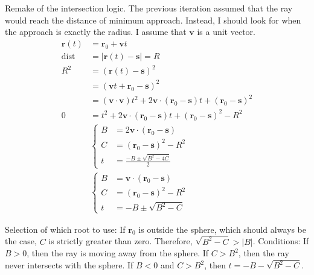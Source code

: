 \documentclass{article}
\renewcommand{\vec}[1]{\mathbf{#1}}
\begin{document}
Remake of the intersection logic.
The previous iteration assumed that the ray would reach the distance of minimum approach.
Instead, I should look for when the approach is exactly the radius.
I assume that $\vec v$ is a unit vector.
\begin{align*}
  \vec r(t) &= \vec r_0 + \vec v t \\
  \textrm{dist} &= \left| \vec r(t) - \vec s \right| = R \\
  R^2
  &= (\vec r(t) - \vec s)^2 \\
  &= (\vec v t + \vec r_0 - \vec s)^2 \\
  &= (\vec v \cdot \vec v)t^2 + 2\vec v \cdot (\vec r_0-\vec s)t + (\vec r_0 - \vec s)^2 \\
  0 &= t^2 + 2\vec v \cdot (\vec r_0-\vec s)t + (\vec r_0 - \vec s)^2 - R^2 \\
  &\left\{\begin{aligned}
      B &= 2\vec v \cdot (\vec r_0-\vec s) \\
      C &= (\vec r_0 - \vec s)^2 - R^2 \\
      t &= \frac{-B \pm \sqrt{B^2-4C}}{2}
  \end{aligned}\right. \\
  &\left\{\begin{aligned}
      B &= \vec v \cdot (\vec r_0-\vec s) \\
      C &= (\vec r_0 - \vec s)^2 - R^2 \\
      t &= -B \pm \sqrt{B^2-C}
  \end{aligned}\right.
\end{align*}

Selection of which root to use:
If $\vec r_0$ is outside the sphere, which should always be the case,
  $C$ is strictly greater than zero.
Therefore, $\sqrt{B^2-C} > |B|$.
Conditions:
If $B>0$, then the ray is moving away from the sphere.
If $C>B^2$, then the ray never intersects with the sphere.
If $B<0$ and $C>B^2$, then $t = -B-\sqrt{B^2-C}$.
\end{document}
